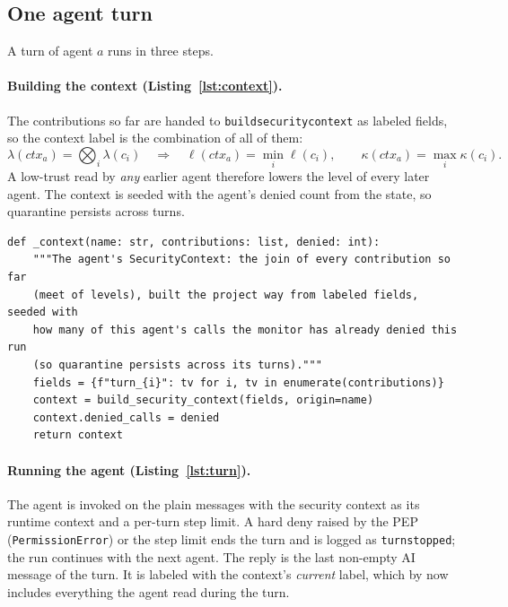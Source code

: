 \documentclass[11pt,a4paper]{article}
\DeclareRobustCommand{\code}[1]{{\renewcommand{\_}{\textunderscore\allowbreak}\texttt{#1}}}
\begin{document}
\subsection{One agent turn}
\label{sec:turn}

A turn of agent $a$ runs in three steps.

\paragraph{Building the context (Listing~\ref{lst:context}).} The contributions so far are
handed to \code{build\_security\_context} as labeled fields, so the context label is the
combination of all of them:
\begin{equation}
  \lambda(\mathit{ctx}_a) = \bigotimes_{i} \lambda(c_i)
  \quad\Longrightarrow\quad
  \ell(\mathit{ctx}_a) = \min_i \ell(c_i),\qquad \kappa(\mathit{ctx}_a) = \max_i \kappa(c_i).
\end{equation}
A low-trust read by \emph{any} earlier agent therefore lowers the level of every later
agent. The context is seeded with the agent's denied count from the state, so quarantine
persists across turns.

\begin{lstlisting}[firstnumber=59,style=py,caption={The security context of a turn (\texttt{systems/graph.py}, lines 59--67)},label={lst:context}]
def _context(name: str, contributions: list, denied: int):
    """The agent's SecurityContext: the join of every contribution so far
    (meet of levels), built the project way from labeled fields, seeded with
    how many of this agent's calls the monitor has already denied this run
    (so quarantine persists across its turns)."""
    fields = {f"turn_{i}": tv for i, tv in enumerate(contributions)}
    context = build_security_context(fields, origin=name)
    context.denied_calls = denied
    return context
\end{lstlisting}

\paragraph{Running the agent (Listing~\ref{lst:turn}).} The agent is invoked on the
plain messages with the security context as its runtime context and a per-turn step
limit. A hard deny raised by the PEP (\code{PermissionError}) or the step limit ends the
turn and is logged as \code{turn\_stopped}; the run continues with the next agent. The
reply is the last non-empty AI message of the turn. It is labeled with the context's
\emph{current} label, which by now includes everything the agent read during the turn.
\end{document}
